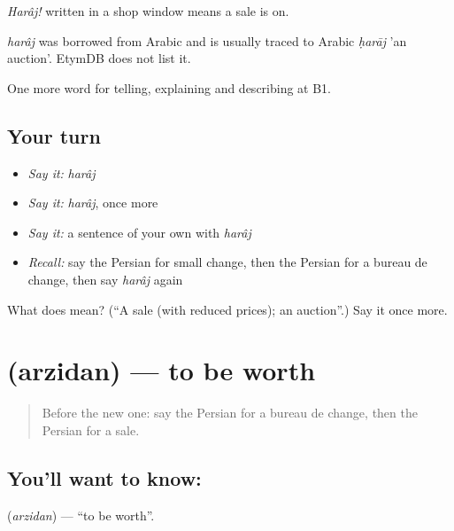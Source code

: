 \emph{Harâj!} written in a shop window means a sale is on.

\begin{cousinweb}
\emph{harâj} was borrowed from Arabic and is usually traced to Arabic \emph{ḥarāj} 'an auction'. EtymDB does not list it.
\end{cousinweb}

\begin{grammarlens}[title={What you've built}]
One more word for telling, explaining and describing at B1.
\end{grammarlens}

\subsection*{Your turn}
\begin{itemize}
\raggedright
  \item \emph{Say it:} \emph{harâj}
  \item \emph{Say it:} \emph{harâj}, once more
  \item \emph{Say it:} a sentence of your own with \emph{harâj}
  \item \emph{Recall:} say the Persian for small change, then the Persian for a bureau de change, then say \emph{harâj} again
\end{itemize}

\begin{tcolorbox}[breakable,colback=teal!4,colframe=teal!35!black,title={Before you move on}]
What does  mean? (\textquotedblleft{}A sale (with reduced prices); an auction\textquotedblright{}.) Say it once more.
\end{tcolorbox}
\section[\texorpdfstring{\fa{ارزیدن} (arzidan)}{ارزیدن (arzidan)}]{ (arzidan) — to be worth}

\label{lesson:FA-C462-arzidan}



\begin{quote}
Before the new one: say the Persian for a bureau de change, then the Persian for a sale.
\end{quote}

\subsection*{You'll want to know: }
\textbf{} (\emph{arzidan}) — \textquotedblleft{}to be worth\textquotedblright{}.

